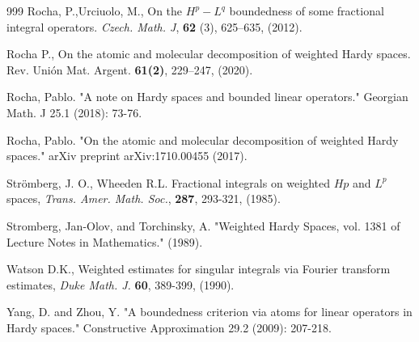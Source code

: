 \documentclass[a4paper,12pt,reqno]{amsart}
\numberwithin{equation}{section}
\begin{document}
\begin{thebibliography}{999}
		  Rocha, P.,Urciuolo, M.,  On the $H^p-L^q$ boundedness of some fractional integral operators.  \emph{Czech. Math. J}, \textbf{62} (3),  625--635, (2012).
		
		 Rocha P., On the atomic and molecular decomposition of weighted Hardy spaces. 
		Rev. Uni\'on Mat. Argent. \textbf{61(2)}, 229--247, (2020). 
		
		 Rocha, Pablo. "A note on Hardy spaces and bounded linear operators." Georgian Math. J 25.1 (2018): 73-76.
		
		 Rocha, Pablo. "On the atomic and molecular decomposition of weighted Hardy spaces." arXiv preprint arXiv:1710.00455 (2017).
		
		 Str\"{o}mberg, J. O., Wheeden R.L. Fractional integrals on weighted $Hp$ and $L^p$ spaces, \emph{ Trans. Amer. Math. Soc.}, \textbf{287}, 293-321, (1985).
		
		 Stromberg, Jan-Olov, and Torchinsky, A. "Weighted Hardy Spaces, vol. 1381 of Lecture Notes in Mathematics." (1989).
		
		 Watson D.K., Weighted estimates for singular integrals via Fourier transform estimates, \emph{Duke Math. J.} \textbf{60}, 389-399, (1990).
		
		 Yang, D. and Zhou, Y. "A boundedness criterion via atoms for linear operators in Hardy spaces." Constructive Approximation 29.2 (2009): 207-218.
		
		
		
		
	\end{thebibliography}
	
\end{document}
